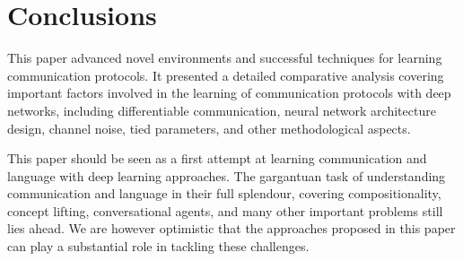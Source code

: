  \section{Conclusions}

This paper advanced novel environments and successful techniques for learning communication protocols. 
It presented a detailed comparative analysis covering important factors involved in the learning of communication protocols with deep networks, including differentiable communication, neural network architecture design, channel noise, tied parameters, and other methodological aspects. 

This paper should be seen as a first attempt at learning communication and language with deep learning approaches. The gargantuan task of understanding communication and language in their full splendour, covering compositionality, concept lifting, conversational agents, and many other important problems still lies ahead. We are however optimistic that the approaches proposed in this paper can play a substantial role in tackling these challenges.